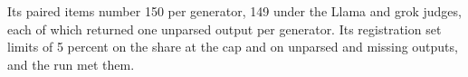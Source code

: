 Its paired items number 150 per generator, 149 under the Llama and grok
judges, each of which returned one unparsed output per generator. Its
registration set limits of 5 percent on the share at the cap and on unparsed
and missing outputs, and the run met them.

